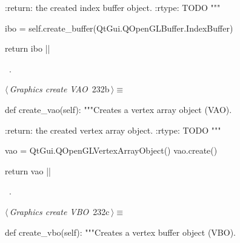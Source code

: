 \documentclass[%
    a4paper,    %
    justified,  %
    nobib,      %
    openany     %
]{tufte-book}
\makeatletter
\renewcommand{\label}[1]{\@tufte@label{##1}}%
\makeatother
\begin{document}
\begin{fullwidth}
\begin{flushleft}
\begin{minipage}{\linewidth}
\begin{pythoncode}
    :return: the created index buffer object.
    :rtype:  TODO
    """

    ibo = self.create_buffer(QtGui.QOpenGLBuffer.IndexBuffer)

    return ibo
|\NWsep|
\end{pythoncode}
\vspace{1.5ex}
\footnotesize
\begin{list}{}{\setlength{\itemsep}{-\parsep}\setlength{\itemindent}{-\leftmargin}}
\item \NWtxtMacroRefIn\ .

\item{}
\end{list}
\end{minipage}\vspace{4ex}
\end{flushleft}
\begin{flushleft} \small
\begin{minipage}{\linewidth}\label{scrap245}\raggedright\small
{} $\langle\,${\itshape Graphics create VAO}\nobreak\ {\footnotesize {232b}}$\,\rangle\equiv$
\vspace{-1ex}
\begin{pythoncode}
def create_vao(self):
    """Creates a vertex array object (VAO).

    :return: the created vertex array object.
    :rtype:  TODO
    """

    vao = QtGui.QOpenGLVertexArrayObject()
    vao.create()

    return vao
|\NWsep|
\end{pythoncode}
\vspace{1.5ex}
\footnotesize
\begin{list}{}{\setlength{\itemsep}{-\parsep}\setlength{\itemindent}{-\leftmargin}}
\item \NWtxtMacroRefIn\ .

\item{}
\end{list}
\end{minipage}\vspace{4ex}
\end{flushleft}
\begin{flushleft} \small
\begin{minipage}{\linewidth}\label{scrap246}\raggedright\small
{} $\langle\,${\itshape Graphics create VBO}\nobreak\ {\footnotesize {232c}}$\,\rangle\equiv$
\vspace{-1ex}
\begin{pythoncode}
def create_vbo(self):
    """Creates a vertex buffer object (VBO).


\end{pythoncode}
\end{minipage}
\end{flushleft}
\end{fullwidth}
\end{document}
